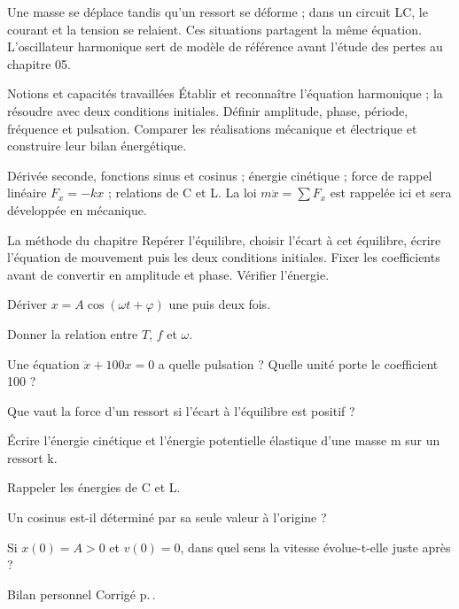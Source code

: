 Une masse se déplace tandis qu’un ressort se déforme ; dans un circuit LC, le courant et la tension se relaient. Ces situations partagent la même équation. L’oscillateur harmonique sert de modèle de référence avant l’étude des pertes au chapitre 05.
\begin{loi}{Notions et capacités travaillées}
Établir et reconnaître l’équation harmonique ; la résoudre avec deux conditions initiales. Définir amplitude, phase, période, fréquence et pulsation. Comparer les réalisations mécanique et électrique et construire leur bilan énergétique.
\end{loi}

Dérivée seconde, fonctions sinus et cosinus ; énergie cinétique ; force de rappel linéaire $F_x=-kx$ ; relations de C et L. La loi $m\ddot x=\sum F_x$ est rappelée ici et sera développée en mécanique.

\begin{methode}{La méthode du chapitre}
Repérer l’équilibre, choisir l’écart à cet équilibre, écrire l’équation de mouvement puis les deux conditions initiales. Fixer les coefficients avant de convertir en amplitude et phase. Vérifier l’énergie.
\end{methode}


\begin{questions}
\item Dériver $x=A\cos(\omega t+\varphi)$ une puis deux fois.
\item Donner la relation entre $T$, $f$ et $\omega$.
\item Une équation $\ddot x+100x=0$ a quelle pulsation ? Quelle unité porte le coefficient 100 ?
\item Que vaut la force d’un ressort si l’écart à l’équilibre est positif ?
\item Écrire l’énergie cinétique et l’énergie potentielle élastique d’une masse m sur un ressort k.
\item Rappeler les énergies de C et L.
\item Un cosinus est-il déterminé par sa seule valeur à l’origine ?
\item Si $x(0)=A>0$ et $v(0)=0$, dans quel sens la vitesse évolue-t-elle juste après ?
\end{questions}
\begin{docu}{Bilan personnel}
Corrigé p.\,\pageref{ch04-corr-diag}.
\end{docu}


